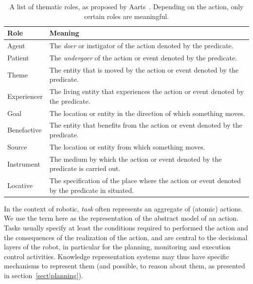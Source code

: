 \documentclass[a4paper, twocolumn]{article}
\begin{document}
\begin{table}
\begin{center}

\begin{tabular}{lp{5cm}}

\toprule
       Role & Meaning \\
\midrule
      Agent & The \emph{doer} or instigator of the action denoted by the predicate. \\
    Patient & The \emph{undergoer} of the action or event denoted by the predicate. \\
      Theme & The entity that is moved by the action or event denoted by the predicate. \\
Experiencer & The living entity that experiences the action or event denoted by the predicate. \\
       Goal & The location or entity in the direction of which something moves. \\
Benefactive & The entity that benefits from the action or event denoted by the predicate. \\
     Source & The location or entity from which something moves. \\
 Instrument & The medium by which the action or event denoted by the predicate is carried out. \\
   Locative & The specification of the place where the action or event denoted by the predicate in situated. \\
\bottomrule

\end{tabular}
\end{center}

\caption{A list of thematic roles, as proposed by Aarts~\cite{Aarts1997}.
Depending on the action, only certain roles are meaningful.}

\label{table|theta-roles}
\end{table}

In the context of robotic, \emph{task} often represents an aggregate of
(atomic) actions. We use the term here as the representation of the abstract
model of an action. Tasks usually specify at least the conditions required to
performed the action and the consequences of the realization of the action, and
are central to the decisional layers of the robot, in particular for the
planning, monitoring and execution control activities. Knowledge representation
systems may thus have specific mechanisms to represent them (and possible, to
reason about them, as presented in section~\ref{sect|planning}).
\end{document}
